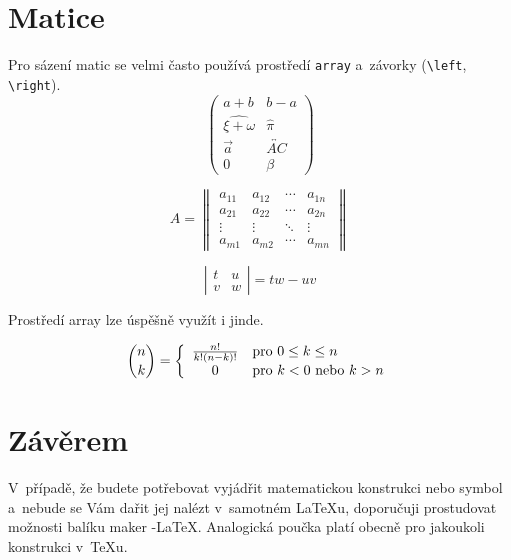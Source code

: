 \documentclass[11pt,a4paper,twocolumn]{article}
\begin{document}
\section{Matice}

Pro sázení matic se velmi často používá prostředí \texttt{array} a~závorky (\verb|\left|, \verb|\right|). 
$$
\left(
 \begin{array}{cc}
  a + b & b - a \\
  \widehat{\xi + \omega} & \hat{\pi} \\
  \vec{a} & \overleftrightarrow{AC} \\
  0 & \beta  
 \end{array}
\right)
$$ 

$$
A =
\left\|
	\begin{array}{cccc}
		a_{11} & a_{12} & \cdots & a_{1n} \\
		a_{21} & a_{22} & \cdots & a_{2n} \\
		\vdots  & \vdots  & \ddots & \vdots  \\
		a_{m1} & a_{m2} & \cdots & a_{mn} 
	\end{array}
\right\|
$$

$$
\left|
	\begin{array}{cc}
		t & u \\
		v & w
	\end{array}
\right|
= tw-uv
$$

Prostředí array lze úspěšně využít i jinde.

$$
\binom{n}{k} =
\left\{
	\begin{array}{c l}
		\frac{n!}{k!(n-k)!} & \text{pro } 0 \leq k \leq n \\
		0 & \text{pro } k < 0 \text{ nebo } k > n
	\end{array}
\right. $$

\section{Závěrem}

V~případě, že budete potřebovat vyjádřit matematickou konstrukci nebo symbol a~nebude se Vám dařit jej nalézt v~samotném \LaTeX u, doporučuji prostudovat možnosti balíku maker \AmS-\LaTeX.
Analogická poučka platí o\-bec\-ně pro ja\-kou\-koli konstrukci v~\TeX u.
\end{document}
